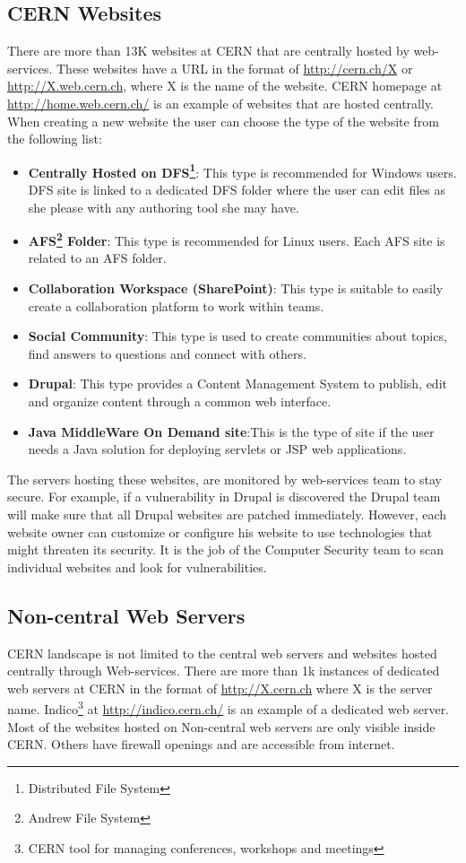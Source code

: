\subsection{CERN Websites}
There are more than 13K websites at CERN that are centrally hosted by web-services. These websites have a URL in the format of \url{http://cern.ch/X} or \url{http://X.web.cern.ch}, where X is the name of the website. CERN homepage at \url{http://home.web.cern.ch/} is an example of websites that are hosted centrally. When creating a new website the user can choose the type of the website from the following list:
\begin{itemize}
\item \textbf{Centrally Hosted on DFS\footnote{Distributed File System}}: This type is recommended for Windows users. DFS site is linked to a dedicated DFS folder where the user can edit files as she please with any authoring tool she may have.
\item \textbf{AFS\footnote{Andrew File System} Folder}: This type is recommended for Linux users. Each AFS site is related to an AFS folder.
\item \textbf{Collaboration Workspace (SharePoint)}: This type is suitable to easily create a collaboration platform to work within teams.
\item \textbf{Social Community}: This type is used to create communities about topics, find answers to questions and connect with others.
\item \textbf{Drupal}: This type provides a Content Management System to publish, edit and organize content through a common web interface.
\item \textbf{Java MiddleWare On Demand site}:This is the type of site if the user needs a Java solution for deploying servlets or JSP web applications.
\end{itemize}
The servers hosting these websites, are monitored by web-services team to stay secure. For example, if a vulnerability in Drupal is discovered the Drupal team will make sure that all Drupal websites are patched immediately. However, each website owner can customize or configure his website to use technologies that might threaten its security. It is the job of the Computer Security team to scan individual websites and look for vulnerabilities. 
\subsection{Non-central Web Servers}
CERN landscape is not limited to the central web servers and websites hosted centrally through Web-services. There are more than 1k instances of dedicated web servers at CERN in the format of \url{http://X.cern.ch} where X is the server name. Indico\footnote{CERN tool for managing conferences, workshops and meetings} at \url{http://indico.cern.ch/} is an example of a dedicated web server. Most of the websites hosted on Non-central web servers are only visible inside CERN. Others have firewall openings and are accessible from internet.


